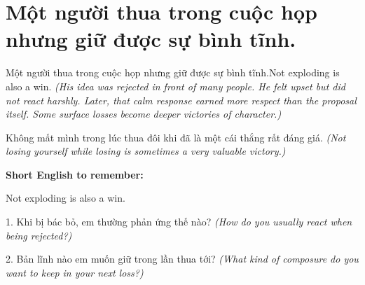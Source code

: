 \section{Một người thua trong cuộc họp nhưng giữ được sự bình tĩnh.}
\begin{truyen}{Một người thua trong cuộc họp nhưng giữ được sự bình tĩnh.}{Not exploding is also a win.}
\textit{(His idea was rejected in front of many people. He felt upset but did not react harshly. Later, that calm response earned more respect than the proposal itself. Some surface losses become deeper victories of character.)}
\end{truyen}
\begin{baihoc}
Không mất mình trong lúc thua đôi khi đã là một cái thắng rất đáng giá.
\textit{(Not losing yourself while losing is sometimes a very valuable victory.)}
\end{baihoc}
\begin{ghinhoanh}\textbf{Short English to remember:}

Not exploding is also a win.
\end{ghinhoanh}
\begin{tuhocnhanh}
1. Khi bị bác bỏ, em thường phản ứng thế nào? \textit{(How do you usually react when being rejected?)}

2. Bản lĩnh nào em muốn giữ trong lần thua tới? \textit{(What kind of composure do you want to keep in your next loss?)}
\end{tuhocnhanh}
\ngancach